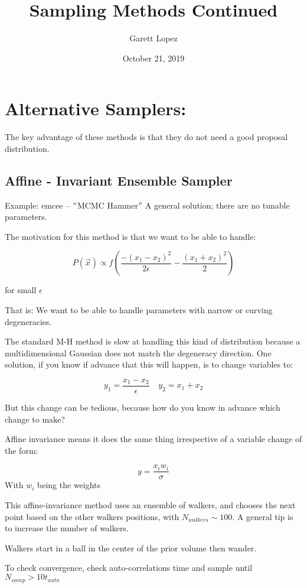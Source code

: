 \documentclass{article}
\author{Garett Lopez}
\date{October 21, 2019}
\title{Sampling Methods Continued}
\begin{document}
\maketitle

\section{Alternative Samplers:}

The key advantage of these methods is that they do not need a good proposal distribution.

\subsection{Affine - Invariant Ensemble Sampler}

Example: emcee -- $``$MCMC Hammer$''$
A general solution; there are no tunable parameters.

The motivation for this method is that we want to be able to handle:

$$ P(\vec{x}) \propto f\left( \frac{-(x_1 - x_2)^2}{2\epsilon} - \frac{(x_1+x_2)^2}{2} \right) $$

for small $\epsilon$


That is:  We want to be able to handle parameters with narrow or curving degeneracies.

The standard M-H method is slow at handling this kind of distribution because a multidimensional Gaussian does not match the degeneracy direction.  One solution, if you know if advance that this will happen, is to change variables to:

$$y_1 = \frac{x_1 - x_2}{\epsilon} \,\,\,\,\,\ y_2 = x_1+x_2$$

But this change can be tedious, because how do you know in advance which change to make?

Affine invariance means it does the same thing irrespective of a variable change of the form:

$$y = \frac{x_i w_i}{\sigma}$$
With $w_i$ being the weights

This affine-invariance method uses an ensemble of walkers, and chooses the next point based on the other walkers positions, with $N_{walkers} \sim 100$. A general tip is to increase the number of walkers.

Walkers start in a ball in the center of the prior volume then wander.

To check convergence, check auto-correlations time and sample until $N_{samp} > 10 t_{auto}$
\end{document}
